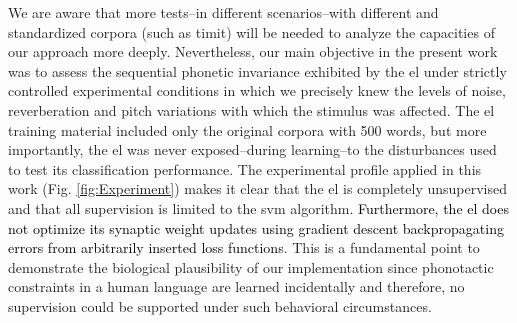 \documentclass[10pt,letterpaper]{article}
\newcommand{\reviewerfour}[1]{\textcolor{black}{#1}}
\begin{document}
We are aware that more tests--in different scenarios--with different and standardized corpora (such as \gls{timit}) will be needed to analyze the capacities of our approach more deeply.
Nevertheless, our main objective in the present work was to assess the sequential phonetic invariance exhibited by the \gls{el} under strictly controlled experimental conditions in which we precisely knew the levels of noise, reverberation and pitch variations with which the stimulus was affected. The \gls{el} training material included only the original corpora with 500 words, but more importantly, the \gls{el} was never exposed--during learning--to the disturbances used to test its classification performance. The experimental profile applied in this work (Fig. \ref{fig:Experiment}) makes it clear that the \gls{el} is completely unsupervised and that all supervision is limited to the \gls{svm} algorithm. \reviewerfour{Furthermore, the \gls{el} does not optimize its synaptic weight updates using gradient descent backpropagating errors from arbitrarily inserted loss functions}. This is a fundamental point to demonstrate the biological plausibility of our implementation since phonotactic constraints in a human language are learned incidentally \cite{BRENT199693,saffran_1997} and therefore, no supervision could be supported under such behavioral circumstances. 

\end{document}
